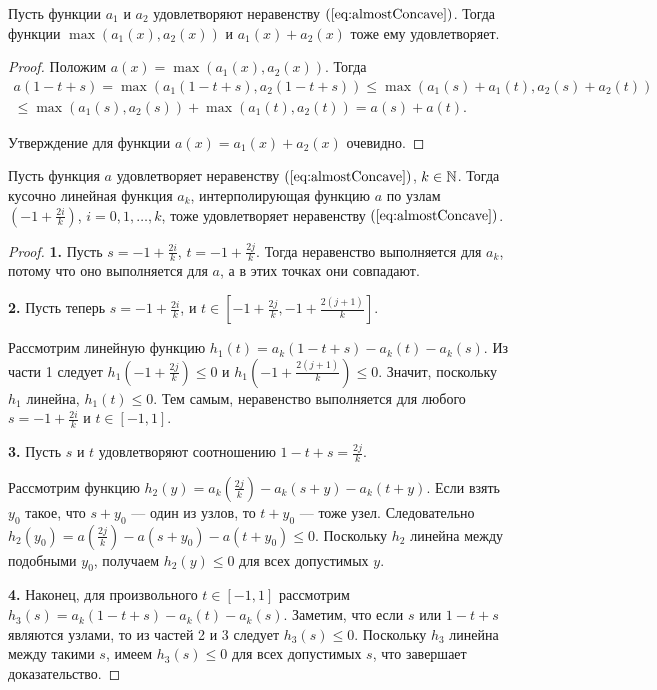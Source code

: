 \begin{lm}
\label{lm:weight_max_sum_concave}
Пусть функции $a_1$ и $a_2$ удовлетворяют неравенству $(\ref{eq:almostConcave})$.
Тогда функции $\max (a_1(x), a_2(x))$ и $a_1(x) + a_2(x)$ тоже ему удовлетворяет.
\end{lm}
\begin{proof}
Положим $a(x) = \max (a_1(x), a_2(x))$.
Тогда
\begin{multline*}
a(1 - t + s) = \max(a_1( 1 - t + s), a_2(1 - t + s)) \le
\max(a_1(s) + a_1(t), a_2(s) + a_2(t)) \\
\le \max(a_1(s), a_2(s)) + \max(a_1(t), a_2(t)) =
a(s) + a(t).
\end{multline*}

Утверждение для функции $a(x) = a_1(x) + a_2(x)$ очевидно.
\end{proof}

\begin{lm}
\label{lm:weight_piecewise_linear_concave}
Пусть функция $a$ удовлетворяет неравенству $(\ref{eq:almostConcave})$, $k \in \mathbb N$.
Тогда кусочно линейная функция $a_k$, интерполирующая функцию $a$ по узлам
$(-1 + \frac{2i}{k})$, $i = 0, 1, \dots, k$, тоже удовлетворяет неравенству $(\ref{eq:almostConcave})$.
\end{lm}
\begin{proof}
\textbf{1.}
Пусть $s = -1 + \frac{2i}{k}$, $t = -1 + \frac{2j}{k}$.
Тогда неравенство выполняется для $a_k$, потому что оно выполняется для $a$,
а в этих точках они совпадают.

\textbf{2.}
Пусть теперь $s = -1 + \frac{2i}{k}$, и $t \in [-1 + \frac{2j}{k}, -1 + \frac{2(j + 1)}{k}]$.

Рассмотрим линейную функцию $h_1(t) = a_k( 1 - t + s ) - a_k(t) - a_k(s)$.
Из части 1 следует $h_1(-1 + \frac{2j}{k}) \le 0$ и $h_1(-1 + \frac{2(j + 1)}{k}) \le 0$.
Значит, поскольку $h_1$ линейна, $h_1(t) \le 0$.
Тем самым, неравенство выполняется для любого $s = -1 + \frac{2i}{k}$ и $t \in [-1, 1]$.

\textbf{3.}
Пусть $s$ и $t$ удовлетворяют соотношению $1 - t + s = \frac{2j}{k}$.

Рассмотрим функцию $h_2(y) = a_k(\frac{2j}{k}) - a_k(s + y) - a_k(t + y)$.
Если взять $y_0$ такое, что $s + y_0$ --- один из узлов, то $t + y_0$ --- тоже узел.
Следовательно $h_2(y_0) = a(\frac{2j}{k}) - a(s + y_0) - a(t + y_0) \le 0$.
Поскольку $h_2$ линейна между подобными $y_0$, получаем $h_2(y) \le 0$ для всех допустимых $y$.

\textbf{4.}
Наконец, для произвольного $t \in [-1, 1]$ рассмотрим $h_3(s) = a_k( 1 - t + s ) - a_k(t) - a_k(s)$.
Заметим, что если $s$ или $1 - t + s$ являются узлами, то из частей 2 и 3 следует $h_3(s) \le 0$.
Поскольку $h_3$ линейна между такими $s$, имеем $h_3(s) \le 0$ для всех допустимых $s$, что завершает доказательство.
\end{proof}
